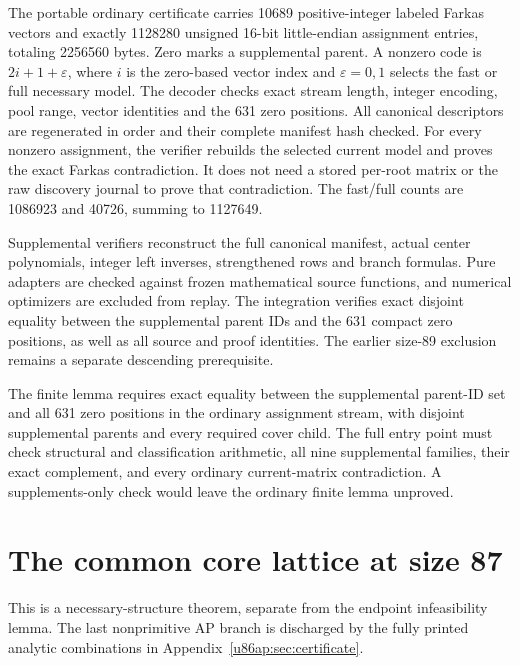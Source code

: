 \documentclass[11pt,a4paper]{article}
\theoremstyle{remark}
\begin{document}
The portable ordinary certificate carries 10689 positive-integer labeled
Farkas vectors and exactly 1128280 unsigned 16-bit little-endian assignment
entries, totaling 2256560 bytes. Zero marks a supplemental parent. A
nonzero code is $2i+1+\varepsilon$, where $i$ is the zero-based vector index
and $\varepsilon=0,1$ selects the fast or full necessary model.
The decoder checks exact stream length, integer encoding, pool range,
vector identities and the 631 zero positions. All canonical descriptors
are regenerated in order and their complete manifest hash checked.
For every nonzero assignment, the verifier rebuilds the selected current
model and proves the exact Farkas contradiction. It does not need a stored
per-root matrix or the raw discovery journal to prove that contradiction.
The fast/full counts are 1086923 and 40726, summing to 1127649.




Supplemental verifiers reconstruct the full canonical manifest, actual
center polynomials, integer left inverses, strengthened rows and branch
formulas. Pure adapters are checked against frozen mathematical source
functions, and numerical optimizers are excluded from replay.
The integration verifies exact disjoint equality between the
supplemental parent IDs and the 631 compact zero positions, as well as
all source and proof identities. The earlier size-89 exclusion remains
a separate descending prerequisite.


The finite lemma requires exact equality between the supplemental
parent-ID set and all 631 zero positions in the ordinary assignment stream,
with disjoint supplemental parents and every required cover child.
The full entry point  must check
structural and classification arithmetic, all nine supplemental families,
their exact complement, and every ordinary current-matrix contradiction.
A supplements-only check would leave the ordinary finite lemma unproved.


\section{The common core lattice at size 87}\label{u86:sec:lattice87}

This is a necessary-structure theorem, separate from the endpoint
infeasibility lemma. The last nonprimitive AP branch is discharged by the fully printed
analytic combinations in Appendix~\ref{u86ap:sec:certificate}.
\end{document}
